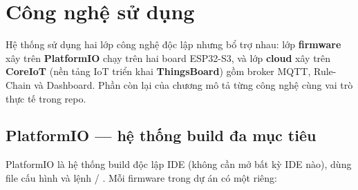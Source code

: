 
\chapter{Công nghệ sử dụng}

Hệ thống sử dụng hai lớp công nghệ độc lập nhưng bổ trợ nhau: lớp
\textbf{firmware} xây trên \textbf{PlatformIO} chạy trên hai board ESP32-S3,
và lớp \textbf{cloud} xây trên \textbf{CoreIoT} (nền tảng IoT triển khai
\textbf{ThingsBoard}) gồm broker MQTT, Rule-Chain và Dashboard. Phần còn lại
của chương mô tả từng công nghệ cùng vai trò thực tế trong repo.

\section{PlatformIO — hệ thống build đa mục tiêu}

PlatformIO là hệ thống build độc lập IDE (không cần mở bất kỳ IDE nào), dùng
file cấu hình  và lệnh  / .
Mỗi firmware trong dự án có một  riêng:

